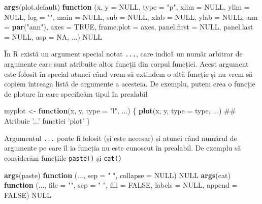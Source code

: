 \documentclass[]{article}
\newenvironment{Shaded}{\begin{snugshade}}{\end{snugshade}}
\newcommand{\KeywordTok}[1]{\textcolor[rgb]{0.13,0.29,0.53}{\textbf{#1}}}
\newcommand{\DataTypeTok}[1]{\textcolor[rgb]{0.13,0.29,0.53}{#1}}
\newcommand{\StringTok}[1]{\textcolor[rgb]{0.31,0.60,0.02}{#1}}
\newcommand{\OtherTok}[1]{\textcolor[rgb]{0.56,0.35,0.01}{#1}}
\newcommand{\ControlFlowTok}[1]{\textcolor[rgb]{0.13,0.29,0.53}{\textbf{#1}}}
\newcommand{\NormalTok}[1]{#1}
\begin{document}
\begin{Shaded}
\begin{Highlighting}[]
\KeywordTok{args}\NormalTok{(plot.default)}
\ControlFlowTok{function}\NormalTok{ (x, }\DataTypeTok{y =} \OtherTok{NULL}\NormalTok{, }\DataTypeTok{type =} \StringTok{"p"}\NormalTok{, }\DataTypeTok{xlim =} \OtherTok{NULL}\NormalTok{, }\DataTypeTok{ylim =} \OtherTok{NULL}\NormalTok{, }
    \DataTypeTok{log =} \StringTok{""}\NormalTok{, }\DataTypeTok{main =} \OtherTok{NULL}\NormalTok{, }\DataTypeTok{sub =} \OtherTok{NULL}\NormalTok{, }\DataTypeTok{xlab =} \OtherTok{NULL}\NormalTok{, }\DataTypeTok{ylab =} \OtherTok{NULL}\NormalTok{, }
    \DataTypeTok{ann =} \KeywordTok{par}\NormalTok{(}\StringTok{"ann"}\NormalTok{), }\DataTypeTok{axes =} \OtherTok{TRUE}\NormalTok{, }\DataTypeTok{frame.plot =}\NormalTok{ axes, }\DataTypeTok{panel.first =} \OtherTok{NULL}\NormalTok{, }
    \DataTypeTok{panel.last =} \OtherTok{NULL}\NormalTok{, }\DataTypeTok{asp =} \OtherTok{NA}\NormalTok{, ...) }
\OtherTok{NULL}
\end{Highlighting}
\end{Shaded}

În R există un argument special notat \texttt{...}, care indică un număr
arbitrar de argumente care sunt atribuite altor funcții din corpul
funcției. Acest argument este folosit în special atunci când vrem să
extindem o altă funcție și nu vrem să copiem întreaga listă de argumente
a acesteia. De exemplu, putem crea o funcție de plotare în care
specificăm tipul în prealabil

\begin{Shaded}
\begin{Highlighting}[]
\NormalTok{myplot <-}\StringTok{ }\ControlFlowTok{function}\NormalTok{(x, y, }\DataTypeTok{type =} \StringTok{"l"}\NormalTok{, ...) \{}
        \KeywordTok{plot}\NormalTok{(x, y, }\DataTypeTok{type =}\NormalTok{ type, ...)         ## Atribuie '...' functiei 'plot'}
\NormalTok{\}}
\end{Highlighting}
\end{Shaded}

Argumentul \texttt{...} poate fi folosit (și este necesar) și atunci
când numărul de argumente pe care îl ia funcția nu este cunoscut în
prealabil. De exemplu să considerăm funcțiile \texttt{paste()} și
\texttt{cat()}

\begin{Shaded}
\begin{Highlighting}[]
\KeywordTok{args}\NormalTok{(paste)}
\ControlFlowTok{function}\NormalTok{ (..., }\DataTypeTok{sep =} \StringTok{" "}\NormalTok{, }\DataTypeTok{collapse =} \OtherTok{NULL}\NormalTok{) }
\OtherTok{NULL}
\KeywordTok{args}\NormalTok{(cat)}
\ControlFlowTok{function}\NormalTok{ (..., }\DataTypeTok{file =} \StringTok{""}\NormalTok{, }\DataTypeTok{sep =} \StringTok{" "}\NormalTok{, }\DataTypeTok{fill =} \OtherTok{FALSE}\NormalTok{, }\DataTypeTok{labels =} \OtherTok{NULL}\NormalTok{, }
    \DataTypeTok{append =} \OtherTok{FALSE}\NormalTok{) }
\OtherTok{NULL}
\end{Highlighting}
\end{Shaded}
\end{document}
